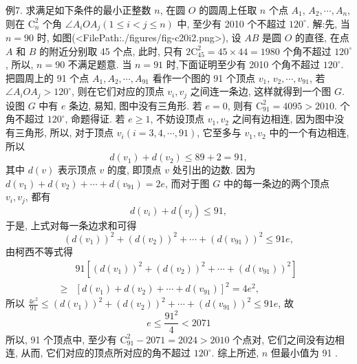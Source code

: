 例7. 求满足如下条件的最小正整数 $n$, 在圆 $O$ 的圆周上任取 $n$ 个点 $A_1$, $A_2, \cdots, A_n$, 则在 $\mathrm{C}_n^2$ 个角 $\angle A_i O A_j(1 \leqslant i<j \leqslant n)$ 中, 至少有 2010 个不超过 $120^{\circ}$.
解:先, 当 $n=90$ 时, 如图(<FilePath:./figures/fig-c20i2.png>), 设 $A B$ 是圆 $O$ 的直径, 在点 $A$ 和 $B$ 的附近分别取 45 个点, 此时, 只有 $2 \mathrm{C}_{45}^2=45 \times 44=1980$ 个角不超过 $120^{\circ}$, 所以, $n=90$ 不满足题意.
当 $n=91$ 时,下面证明至少有 2010 个角不超过 $120^{\circ}$.
把圆周上的 91 个点 $A_1, A_2, \cdots, A_{91}$ 看作一个图的 91 个顶点 $v_1$, $v_2, \cdots, v_{91}$, 若 $\angle A_i O A_j>120^{\circ}$, 则在它们对应的顶点 $v_i, v_j$ 之间连一条边, 这样就得到一个图 $G$.
设图 $G$ 中有 $e$ 条边, 易知, 图中没有三角形.
若 $e=0$, 则有 $\mathrm{C}_{91}^2=4095>2010$. 个角不超过 $120^{\circ}$, 命题得证.
若 $e \geqslant 1$, 不妨设顶点 $v_1, v_2$ 之间有边相连, 因为图中没有三角形, 所以, 对于顶点 $v_i(i=3,4, \cdots, 91)$, 它至多与 $v_1, v_2$ 中的一个有边相连, 所以
$$
d\left(v_1\right)+d\left(v_2\right) \leqslant 89+2=91,
$$
其中 $d(v)$ 表示顶点 $v$ 的度, 即顶点 $v$ 处引出的边数.
因为 $d\left(v_1\right)+d\left(v_2\right)+\cdots+d\left(v_{91}\right)=2 e$, 而对于图 $G$ 中的每一条边的两个顶点 $v_i, v_j$, 都有
$$
d\left(v_i\right)+d\left(v_j\right) \leqslant 91,
$$
于是, 上式对每一条边求和可得
$$
\left(d\left(v_1\right)\right)^2+\left(d\left(v_2\right)\right)^2+\cdots+\left(d\left(v_{91}\right)\right)^2 \leqslant 91 e,
$$
由柯西不等式得
$$
\begin{aligned}
& 91\left[\left(d\left(v_1\right)\right)^2+\left(d\left(v_2\right)\right)^2+\cdots+\left(d\left(v_{91}\right)\right)^2\right] \\
\geqslant & {\left[d\left(v_1\right)+d\left(v_2\right)+\cdots+d\left(v_{91}\right)\right]^2=4 e^2, }
\end{aligned}
$$
所以 $\frac{4 e^2}{91} \leqslant\left(d\left(v_1\right)\right)^2+\left(d\left(v_2\right)\right)^2+\cdots+\left(d\left(v_{91}\right)\right)^2 \leqslant 91 e$, 故
$$
e \leqslant \frac{91^2}{4}<2071
$$
所以, 91 个顶点中, 至少有 $\mathrm{C}_{91}^2-2071=2024>2010$ 个点对, 它们之间没有边相连, 从而, 它们对应的顶点所对应的角不超过 $120^{\circ}$.
综上所述, $n$ 但最小值为 91 .




